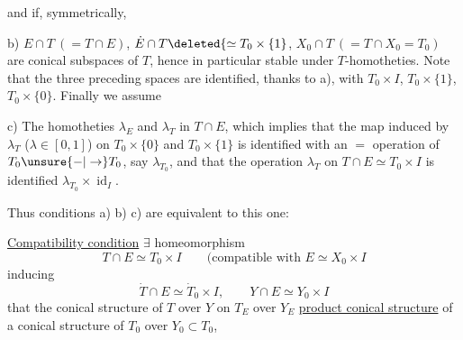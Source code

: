 
and if, symmetrically,

b) $E\cap T\ (=T\cap E)$, $\dot E\cap T\deleted{\simeq T_0\times\{1}$,
$X_0\cap T\ (=T\cap X_0=T_0)$ are
conical subspaces of $T$, hence in particular
stable under $T$-homotheties.  Note that
the three preceding spaces are identified, thanks to a),
with $T_0\times I$, $T_0\times\{1\}$, $T_0\times\{0\}$. Finally we assume

c) The homotheties  $\lambda_E$ and $\lambda_T$ 
in $T\cap E$, which implies that the map
 induced by $\lambda_T$ ($\lambda\in[0,1]$) on
$T_0\times\{0\}$ and $T_0\times\{1\}$
is identified with an $=$  operation of
$T_0\unsure{-|\to}T_0$,  say $\lambda_{T_0}$, and that the operation
$\lambda_T$ on $T\cap E\simeq T_0\times I$ is identified 
 $\lambda_{T_0}\times\operatorname{id}_I$.

Thus conditions a) b) c) are equivalent to this one:

\uline{Compatibility condition} $\exists$ homeomorphism
\[
T\cap E\simeq T_0\times I
\qquad\text{(compatible with }E\simeq X_0\times I
\]
inducing
\[
\dot T\cap E\simeq\dot T_0\times I,\qquad Y\cap E\simeq Y_0\times I
\]
 that the conical structure of $T$ over $Y$
 on $T_E$ over $Y_E$
 
\uline{product conical structure} 
of a conical structure of
$T_0$ over $Y_0\subset T_0$, 
